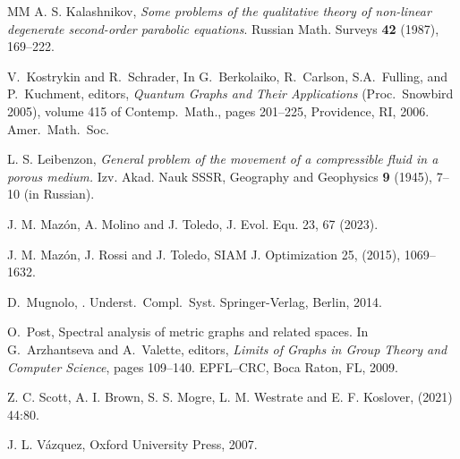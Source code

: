 \documentclass[reqno,12pt]{amsart}
\numberwithin{equation}{section} %
\begin{document}
\begin{thebibliography}{MM}
 A. S. Kalashnikov, {\it Some problems of the qualitative theory of non-linear degenerate
second-order parabolic equations}. Russian Math. Surveys {\bf 42} (1987), 169--222.

V.\ Kostrykin and R.\ {S}chrader,
\newblock In G.\ Berkolaiko, R.~Carlson, S.A.\ Fulling, and P.\ Kuchment,
  editors, {\em Quantum Graphs and Their Applications} (Proc.\ Snowbird 2005),
  volume 415 of  Contemp.\ Math., pages 201--225, Providence, RI, 2006.
  Amer.\ Math.\ Soc.

  L. S. Leibenzon,  {\it General problem of the movement of a compressible fluid in a porous
medium.} Izv. Akad. Nauk SSSR, Geography and Geophysics {\bf 9} (1945), 7--10 (in Russian).

 


   J. M. Mazón, A. Molino and J. Toledo,
  \newblock J. Evol. Equ.  23, 67 (2023).

   J. M. Mazón, J. Rossi and J. Toledo,
  \newblock  SIAM J. Optimization  25, (2015), 1069--1632.

  

D.~Mugnolo,
.
\newblock Underst.\ Compl.\ Syst. Springer-Verlag, Berlin, 2014.

 

O.~Post,
\newblock Spectral analysis of metric graphs and related spaces.
\newblock In G.~Arzhantseva and A.~Valette, editors, {\em Limits of Graphs in
  Group Theory and Computer Science}, pages 109--140. EPFL--CRC, Boca Raton,
  FL, 2009.

   Z. C. Scott, A. I. Brown, S. S. Mogre, L. M. Westrate and E. F. Koslover,
   (2021) 44:80.


   J. L. Vázquez,  Oxford University Press, 2007.

\end{thebibliography}
\end{document}
